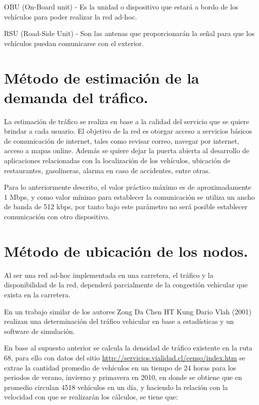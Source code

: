 \documentclass[12pt]{article}
\begin{document}
OBU (On-Board unit) - Es la unidad o dispositivo que estará a bordo de los vehículos para poder realizar 
la red ad-hoc.

RSU (Road-Side Unit) - Son las antenas que proporcionarán la señal para que los vehículos puedan comunicarse 
con el exterior.

\normalsize
\newpage
\section{Método de estimación de la demanda del tráfico.}

La estimación de tráfico se realiza en base a la calidad del servicio que se quiere brindar a cada 
usuario. El objetivo de la red es otorgar acceso a servicios básicos de comunicación de internet, tales
como revisar correo, navegar por internet, acceso a mapas on\-line. Además se quiere dejar la puerta 
abierta al desarrollo de aplicaciones relacionadas con la localización de los vehículos, ubicación de 
restaurantes, gasolineras, alarma en caso de accidentes, entre otras.

Para lo anteriormente descrito, el valor práctico máximo es de aproximadamente  1  Mbps,  y  como  
valor  mínimo  para  establecer  la comunicación se utiliza un ancho  de  banda   de  512  kbps,  por 
tanto  bajo este parámetro no será posible establecer comunicación con otro dispositivo.

\section{Método de ubicación de los nodos.}

Al ser una red ad-hoc implementada en una carretera, el tráfico y la disponibilidad de la red, dependerá 
parcialmente de la congestión vehicular que exista en la carretera.

En un trabajo similar de los autores Zong Da Chen HT Kung Dario Vlah (2001) realizan una determinación 
del tráfico vehicular en base a estadísticas y un software de simulación. 

En base al supuesto anterior se calcula la densidad de tráfico existente en la ruta 68, para ello con datos 
del sitio \url{http://servicios.vialidad.cl/censo/index.htm} se extrae la cantidad promedio de vehículos 
en un tiempo de 24 horas para los periodos de verano, invierno y primavera en 2010, en donde se obtiene que 
en promedio circulan 4518 vehículos en un día, y haciendo la relación con la velocidad con que se 
realizarán los cálculos, se tiene que:\\
\end{document}
